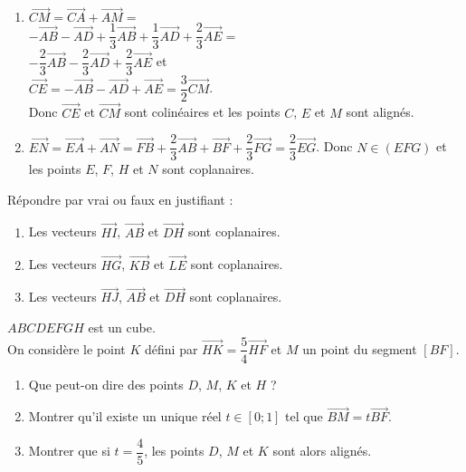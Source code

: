 \documentclass{cornouaille}
\begin{document}
\begin{colonne*exercice}
\begin{corrige}
\begin{enumerate}
\item $\overrightarrow{CM}=\overrightarrow{CA}+\overrightarrow{AM}=$\\
$-\overrightarrow{AB}-\overrightarrow{AD}+
\dfrac{1}{3}\overrightarrow{AB}+\dfrac{1}{3}\overrightarrow{AD}+\dfrac{2}{3}\overrightarrow{AE}=$\\
$-\dfrac{2}{3}\overrightarrow{AB}-\dfrac{2}{3}\overrightarrow{AD}+\dfrac{2}{3}\overrightarrow{AE}$ et \\ 
$\overrightarrow{CE}=-\overrightarrow{AB}-\overrightarrow{AD}+\overrightarrow{AE}=\dfrac{3}{2}\overrightarrow{CM}$.\\
Donc $\overrightarrow{CE}$ et $\overrightarrow{CM}$ sont colinéaires et 
les points $C$, $E$ et $M$ sont alignés.

\item $\overrightarrow{EN}=\overrightarrow{EA}+\overrightarrow{AN}=\overrightarrow{FB}+\dfrac{2}{3}\overrightarrow{AB}+\overrightarrow{BF}+\dfrac{2}{3}\overrightarrow{FG}=\dfrac{2}{3}\overrightarrow{EG}$.
Donc $N\in(EFG)$ et les points $E$, $F$, $H$ et $N$ sont coplanaires.
\end{enumerate}
\end{corrige}

\begin{exercice}
  Répondre par vrai ou faux en justifiant :
  \begin{enumerate}
  \item Les vecteurs $\overrightarrow{HI}$, $\overrightarrow{AB}$ et
    $\overrightarrow{DH}$ sont coplanaires.
  \item Les vecteurs $\overrightarrow{HG}$, $\overrightarrow{KB}$ et
    $\overrightarrow{LE}$ sont coplanaires.
  \item Les vecteurs $\overrightarrow{HJ}$, $\overrightarrow{AB}$ et
    $\overrightarrow{DH}$ sont coplanaires.
  \end{enumerate}
\end{exercice}

\begin{exercice}\label{G2Exo43}
  $ABCDEFGH$ est un cube.\\
  On considère le point $K$ défini par
  $\overrightarrow{HK}=\dfrac{5}{4}\overrightarrow{HF}$ et $M$ un
  point du segment $[BF]$.
  \begin{enumerate}
  \item Que peut-on dire des points $D$, $M$, $K$ et $H$ ?
  \item Montrer qu'il existe un unique réel $t\in\left[ 0;1\right] $
    tel que $\overrightarrow{BM}=t\overrightarrow{BF}$.
  \item Montrer que si $t=\dfrac{4}{5}$, les points $D$, $M$ et $K$
    sont alors alignés.
  \end{enumerate}
\end{exercice}


\end{colonne*exercice}
\end{document}
